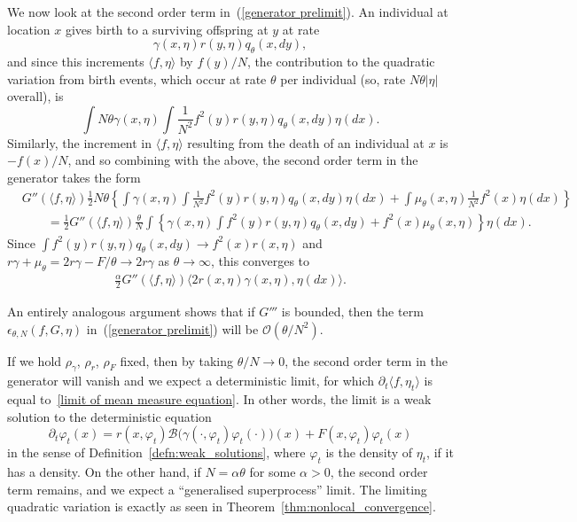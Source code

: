 \documentclass[12pt]{article}
\newcommand{\bigO}{\mathcal{O}}
\newcommand{\DG}{\mathcal{B}}  %
\numberwithin{equation}{section}
\begin{document}
We now look at the second order term in~(\ref{generator prelimit}).
An individual at location $x$ gives birth 
to a surviving offspring at $y$ at rate
$$
\gamma(x,\eta) r(y,\eta) q_{\theta}(x, dy) ,
$$
and since this increments $\langle f, \eta \rangle$ by $f(y) / N$,
the contribution to the quadratic variation from birth events,
which occur at rate $\theta$ per individual 
(so, rate $N\theta |\eta|$ overall), is
$$
\int
    N \theta \gamma(x,\eta)
    \int \frac{1}{N^2} f^2(y) r(y,\eta)
    q_\theta(x,dy) 
\eta(dx) .
$$
Similarly, the increment in $\langle f, \eta\rangle$ resulting from 
the death of an individual at $x$ is $-f(x)/N$, and so combining with the 
above, the second order term in the generator takes the form
\begin{align*}
& G''(\langle f,\eta\rangle)
\frac{1}{2} N \theta
\left\{
    \int
        \gamma(x,\eta)
        \int \frac{1}{N^2}f^2(y)r(y,\eta)q_\theta(x,dy) 
    \eta(dx)
    +
    \int
        \mu_\theta(x,\eta)\frac{1}{N^2}f^2(x) 
    \eta(dx)
\right\} \\
&\qquad
= \frac{1}{2} G''(\langle f, \eta \rangle)
    \frac{\theta}{N}
	\int\left\{
		\gamma(x, \eta) \int f^2(y) r(y, \eta) q_\theta(x, dy) + f^2(x) \mu_\theta(x, \eta)
    \right\} \eta(dx) .
\end{align*}
Since $\int f^2(y) r(y, \eta) q_\theta(x, dy) \to f^2(x) r(x, \eta)$
and $r\gamma  + \mu_\theta = 2 r \gamma  - F / \theta \to 2 r \gamma$
as $\theta \to \infty$,
this converges to
\begin{align*}
\frac{\alpha}{2} G''(\langle f, \eta \rangle)
    \big\langle
	2 r(x, \eta) \gamma(x, \eta),
        \eta(dx)
    \big\rangle .
\end{align*}

An entirely analogous argument shows that if $G'''$ is bounded, then
the term $\epsilon_{\theta,N}(f, G, \eta)$ 
in~(\ref{generator prelimit}) will be $\bigO(\theta/N^2)$. 

If we hold $\rho_\gamma$, $\rho_r$, $\rho_F$ fixed, then 
by taking $\theta/N \rightarrow 0$, the second order term in the generator 
will vanish and we expect a deterministic limit,
for which $\partial_t \langle f, \eta_t \rangle$ is equal to~\eqref{limit of mean measure equation}.
In other words, the limit is a weak solution to the deterministic equation
\begin{equation}
\label{deterministic limit}
\partial_t\varphi_t(x)
=
    r(x,\varphi_t)
    \DG\big(
        \gamma(\cdot,\varphi_t) \varphi_t(\cdot)
    \big)(x)
    + F(x, \varphi_t) \varphi_t(x) 
\end{equation}
in the sense of Definition~\ref{defn:weak_solutions},
where $\varphi_t$ is the density of $\eta_t$, if it has a density.
On the other hand, if $N = \alpha \theta$ for some $\alpha > 0$,
the second order term remains, and we expect a ``generalised superprocess'' limit.
The limiting quadratic variation
is exactly as seen in Theorem~\ref{thm:nonlocal_convergence}.
\end{document}

